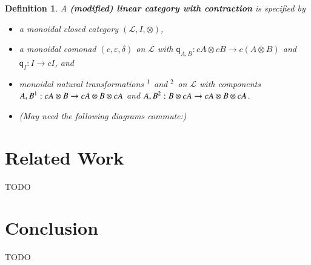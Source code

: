 \documentclass{article}
\newtheorem{definition}[theorem]{Definition}
\let\mto\to
\let\to\relax
\newcommand{\to}{\rightarrow}
\let\d\relax
\newcommand{\cat}[1]{\mathcal{#1}}
\newcommand{\d}[1]{\mathsf{d}_{#1}}
\newcommand{\q}[1]{\mathsf{q}_{#1}}
\begin{document}
\begin{definition}
  \label{def:contraction}
  A \textbf{(modified) linear category with contraction} is specified by
  \begin{itemize}
  \item a monoidal closed category $(\cat{L},I,\otimes)$,
  \item a monoidal comonad $(c,\varepsilon,\delta)$ on $\cat{L}$ with
    $\q{A,B}:cA\otimes cB\mto c(A\otimes B)$ and $\q{I}:I\mto cI$, and
  \item monoidal natural transformations $\d{}^1$ and $\d{}^2$ on $\cat{L}$
    with components $\d{A,B}^1:cA\otimes B\mto cA\otimes B\otimes cA$ and 
    $\d{A,B}^2:B\otimes cA\mto cA\otimes B\otimes cA$.
  \item (May need the following diagrams commute:)
  \end{itemize}
\end{definition}


\section{Related Work}
\label{sec:related_work}
TODO


\section{Conclusion}
\label{sec:conclusion}
TODO

 

\appendix

\end{document}
